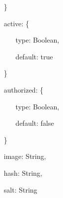 \documentclass{article}
\begin{document}
\begin{itemize}
	\item[\}]
	\item[active: \{]
	\begin{itemize}
		\item[]
		\item[]type: Boolean,
		\item[]default: true 
	\end{itemize}
	\item[\}]
	\item[authorized: \{]
	\begin{itemize}
		\item[]
		\item[]type: Boolean,
		\item[]default: false 
	\end{itemize}
	\item[\}]
	\item[]image: String,
  	\item[]hash: String,
  	\item[]salt: String 
\end{itemize}
\end{document}
